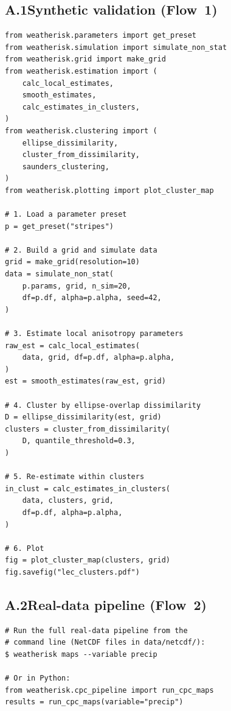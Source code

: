 \documentclass[preprint,12pt,a4paper]{elsarticle}
\begin{document}
\subsection{A.1\quad Synthetic validation (Flow~1)}

\begin{lstlisting}[caption={Complete synthetic validation
  workflow.}, label=lst:app-validate]
from weatherisk.parameters import get_preset
from weatherisk.simulation import simulate_non_stat
from weatherisk.grid import make_grid
from weatherisk.estimation import (
    calc_local_estimates,
    smooth_estimates,
    calc_estimates_in_clusters,
)
from weatherisk.clustering import (
    ellipse_dissimilarity,
    cluster_from_dissimilarity,
    saunders_clustering,
)
from weatherisk.plotting import plot_cluster_map

# 1. Load a parameter preset
p = get_preset("stripes")

# 2. Build a grid and simulate data
grid = make_grid(resolution=10)
data = simulate_non_stat(
    p.params, grid, n_sim=20,
    df=p.df, alpha=p.alpha, seed=42,
)

# 3. Estimate local anisotropy parameters
raw_est = calc_local_estimates(
    data, grid, df=p.df, alpha=p.alpha,
)
est = smooth_estimates(raw_est, grid)

# 4. Cluster by ellipse-overlap dissimilarity
D = ellipse_dissimilarity(est, grid)
clusters = cluster_from_dissimilarity(
    D, quantile_threshold=0.3,
)

# 5. Re-estimate within clusters
in_clust = calc_estimates_in_clusters(
    data, clusters, grid,
    df=p.df, alpha=p.alpha,
)

# 6. Plot
fig = plot_cluster_map(clusters, grid)
fig.savefig("lec_clusters.pdf")
\end{lstlisting}

\subsection{A.2\quad Real-data pipeline (Flow~2)}

\begin{lstlisting}[caption={CPC precipitation clustering via
  CLI.}, label=lst:app-cpc-cli]
# Run the full real-data pipeline from the
# command line (NetCDF files in data/netcdf/):
$ weatherisk maps --variable precip

# Or in Python:
from weatherisk.cpc_pipeline import run_cpc_maps
results = run_cpc_maps(variable="precip")
\end{lstlisting}
\end{document}
